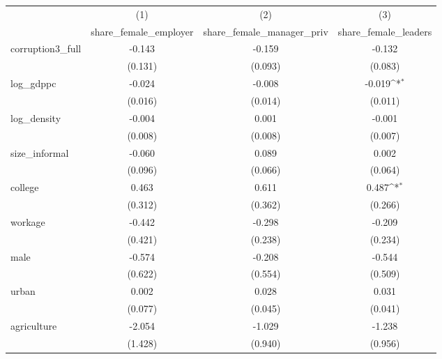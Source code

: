 {
\def\sym#1{\ifmmode^{#1}\else\(^{#1}\)\fi}
\begin{tabular}{l*{3}{c}}
\hline\hline
            &\multicolumn{1}{c}{(1)}&\multicolumn{1}{c}{(2)}&\multicolumn{1}{c}{(3)}\\
            &\multicolumn{1}{c}{share\_female\_employer}&\multicolumn{1}{c}{share\_female\_manager\_priv}&\multicolumn{1}{c}{share\_female\_leaders}\\
\hline
corruption3\_full&      -0.143         &      -0.159         &      -0.132         \\
            &     (0.131)         &     (0.093)         &     (0.083)         \\
[1em]
log\_gdppc   &      -0.024         &      -0.008         &      -0.019\sym{*}  \\
            &     (0.016)         &     (0.014)         &     (0.011)         \\
[1em]
log\_density &      -0.004         &       0.001         &      -0.001         \\
            &     (0.008)         &     (0.008)         &     (0.007)         \\
[1em]
size\_informal&      -0.060         &       0.089         &       0.002         \\
            &     (0.096)         &     (0.066)         &     (0.064)         \\
[1em]
college     &       0.463         &       0.611         &       0.487\sym{*}  \\
            &     (0.312)         &     (0.362)         &     (0.266)         \\
[1em]
workage     &      -0.442         &      -0.298         &      -0.209         \\
            &     (0.421)         &     (0.238)         &     (0.234)         \\
[1em]
male        &      -0.574         &      -0.208         &      -0.544         \\
            &     (0.622)         &     (0.554)         &     (0.509)         \\
[1em]
urban       &       0.002         &       0.028         &       0.031         \\
            &     (0.077)         &     (0.045)         &     (0.041)         \\
[1em]
agriculture &      -2.054         &      -1.029         &      -1.238         \\
            &     (1.428)         &     (0.940)         &     (0.956)         \\

\end{tabular}}
